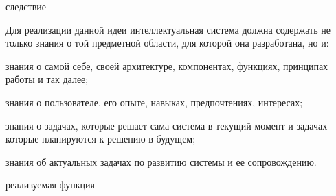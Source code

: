 {\begin{SCn}
\begin{scnindent}
\begin{scnindent}
\begin{scnindent}
\begin{scnrelfromlistcustom}{следствие}
				\end{scnrelfromlistcustom}
				{Для реализации данной идеи интеллектуальная система должна содержать не только знания о той предметной области, для которой она разработана, но и:
				\begin{scnitemize}
					\item знания о самой себе, своей архитектуре, компонентах, функциях, принципах работы и так далее;
					\item знания о пользователе, его опыте, навыках, предпочтениях, интересах;
					\item знания о задачах, которые решает сама система в текущий момент и задачах которые планируются к решению в будущем;
					\item знания об актуальных задачах по развитию системы и ее сопровождению. 
				\end{scnitemize}
			}
			\begin{scnindent}
			\end{scnindent}
			\begin{scnrelfromlistcustom}{реализуемая функция}
			\end{scnrelfromlistcustom}
		\end{scnindent}
	\end{scnindent}
	\end{scnindent}
\end{SCn}

\vspace{-\baselineskip}

}
